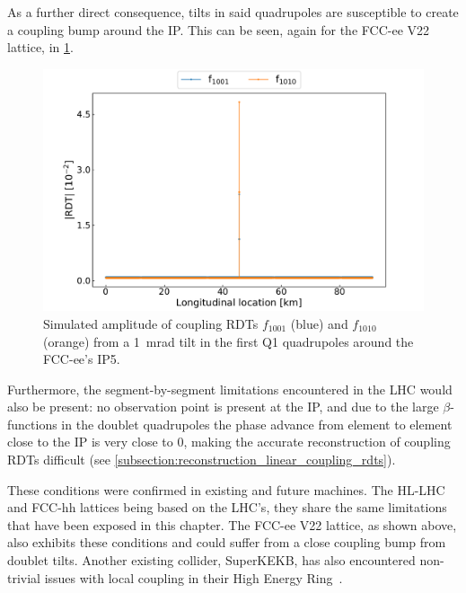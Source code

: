 As a further direct consequence, tilts in said quadrupoles are susceptible to create a coupling bump around the IP.
This can be seen, again for the FCC-ee V\num{22} lattice, in \cref{figure:fccee_ip5_coupling_bump}.

\begin{figure}[!htb]
    \centering
    \includegraphics*[width=\textwidth]{Figures/IR_Coupling_Correction/fccee_ip5_coupling_bump.pdf}
    \caption{Simulated amplitude of coupling RDTs \(f_{1001}\) (\textcolor{mplblue}{blue}) and \(f_{1010}\) (\textcolor{mplorange}{orange}) from a \qty{1}{\milli\radian} tilt in the first Q\num{1} quadrupoles around the FCC-ee's IP\num{5}.}
    \label{figure:fccee_ip5_coupling_bump}
\end{figure}

Furthermore, the segment-by-segment limitations encountered in the \gls{LHC} would also be present: no observation point is present at the \gls{IP}, and due to the large \(\beta\)-functions in the doublet quadrupoles the phase advance from element to element close to the IP is very close to \num{0}, making the accurate reconstruction of coupling \glspl{RDT} difficult (see \cref{subsection:reconstruction_linear_coupling_rdts}).

These conditions were confirmed in existing and future machines.
The \gls{HL-LHC} and FCC-hh lattices being based on the LHC's, they share the same limitations that have been exposed in this chapter.
The FCC-ee V\num{22} lattice, as shown above, also exhibits these conditions and could suffer from a close coupling bump from doublet tilts.
Another existing collider, SuperKEKB, has also encountered non-trivial issues with local coupling in their High Energy Ring~\cite{ICFA:Morita:Optics_Corrections_including_IP_Local_Coupling_at_SuperKEKB}.


